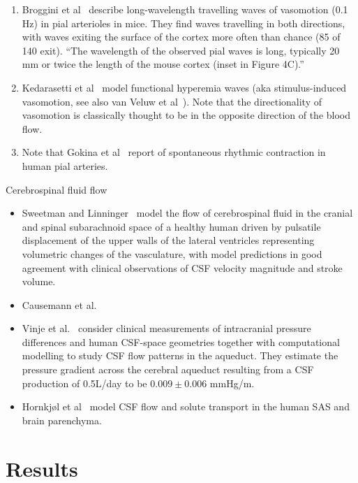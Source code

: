\documentclass[fleqn,10pt]{wlscirep}
\begin{document}
\begin{enumerate}
\item
  Broggini et al~\cite{broggini2024long} describe long-wavelength travelling waves of vasomotion (0.1 Hz) in pial arterioles in mice. They find waves travelling in both directions, with waves exiting the surface of the cortex more often than chance (85 of 140 exit). ``The wavelength of the observed pial waves is long, typically 20 mm or twice the length of the mouse cortex (inset in Figure 4C).''
\item
  Kedarasetti et al~\cite{kedarasetti2020functional} model functional hyperemia waves (aka stimulus-induced vasomotion, see also van Veluw et al~\cite{vanveluw2020vasomotion}). Note that the directionality of vasomotion is classically thought to be in the opposite direction of the blood flow.
\item
  Note that Gokina et al~\cite{gokina1996electrical} report of spontaneous rhythmic contraction in human pial arteries.
\end{enumerate}
Cerebrospinal fluid flow
\begin{itemize}
\item
  Sweetman and Linninger~\cite{sweetman2011cerebrospinal} model the flow of cerebrospinal fluid in the cranial and spinal subarachnoid space of a healthy human driven by pulsatile displacement of the upper walls of the lateral ventricles representing volumetric changes of the vasculature, with model predictions in good agreement with clinical observations of CSF velocity magnitude and stroke volume. 
\item Causemann et al.~\cite{causemann2022human}
\item
  Vinje et al.~\cite{vinje2019respiratory} consider clinical measurements of intracranial pressure differences and human CSF-space geometries together with computational modelling to study CSF flow patterns in the aqueduct. They estimate the pressure gradient across the cerebral aqueduct resulting from a CSF production of 0.5L/day to be $0.009 \pm 0.006$ mmHg/m.
\item Hornkjøl et al~\cite{hornkjol2022csf} model CSF flow and solute transport in the human SAS and brain parenchyma. 
\end{itemize}

\section*{Results}
\end{document}
